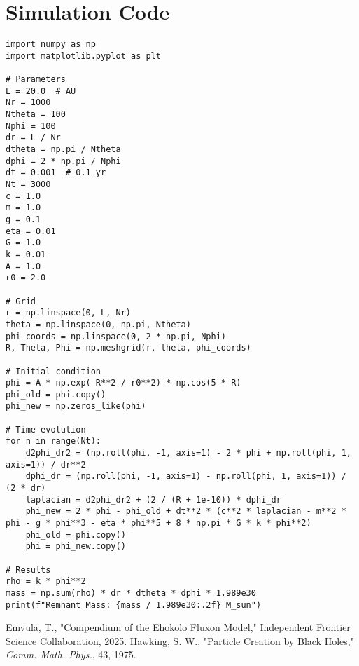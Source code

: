 \documentclass[11pt]{article}
\begin{document}
\appendix
\section{Simulation Code}
\lstset{language=Python, basicstyle=\footnotesize\ttfamily, breaklines=true, numbers=left}
\begin{lstlisting}
import numpy as np
import matplotlib.pyplot as plt

# Parameters
L = 20.0  # AU
Nr = 1000
Ntheta = 100
Nphi = 100
dr = L / Nr
dtheta = np.pi / Ntheta
dphi = 2 * np.pi / Nphi
dt = 0.001  # 0.1 yr
Nt = 3000
c = 1.0
m = 1.0
g = 0.1
eta = 0.01
G = 1.0
k = 0.01
A = 1.0
r0 = 2.0

# Grid
r = np.linspace(0, L, Nr)
theta = np.linspace(0, np.pi, Ntheta)
phi_coords = np.linspace(0, 2 * np.pi, Nphi)
R, Theta, Phi = np.meshgrid(r, theta, phi_coords)

# Initial condition
phi = A * np.exp(-R**2 / r0**2) * np.cos(5 * R)
phi_old = phi.copy()
phi_new = np.zeros_like(phi)

# Time evolution
for n in range(Nt):
    d2phi_dr2 = (np.roll(phi, -1, axis=1) - 2 * phi + np.roll(phi, 1, axis=1)) / dr**2
    dphi_dr = (np.roll(phi, -1, axis=1) - np.roll(phi, 1, axis=1)) / (2 * dr)
    laplacian = d2phi_dr2 + (2 / (R + 1e-10)) * dphi_dr
    phi_new = 2 * phi - phi_old + dt**2 * (c**2 * laplacian - m**2 * phi - g * phi**3 - eta * phi**5 + 8 * np.pi * G * k * phi**2)
    phi_old = phi.copy()
    phi = phi_new.copy()

# Results
rho = k * phi**2
mass = np.sum(rho) * dr * dtheta * dphi * 1.989e30
print(f"Remnant Mass: {mass / 1.989e30:.2f} M_sun")
\end{lstlisting}




\begin{thebibliography}{9}
Emvula, T., "Compendium of the Ehokolo Fluxon Model," Independent Frontier Science Collaboration, 2025.
Hawking, S. W., "Particle Creation by Black Holes," \textit{Comm. Math. Phys.}, 43, 1975.
\end{thebibliography}
\end{document}
